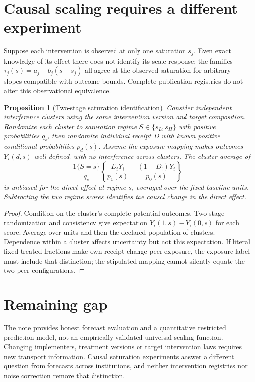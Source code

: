 \documentclass[11pt]{article}
\newtheorem{proposition}[theorem]{Proposition}
\theoremstyle{remark}
\begin{document}
\section*{Causal scaling requires a different experiment}
Suppose each intervention is observed at only one saturation $s_j$. Even exact knowledge of its effect there does not identify its scale response: the families
$\tau_j(s)=a_j+b_j(s-s_j)$ all agree at the observed saturation for arbitrary slopes compatible with outcome bounds. Complete publication registries do not alter this observational equivalence.

\begin{proposition}[Two-stage saturation identification]
Consider independent interference clusters using the same intervention version and target composition. Randomize each cluster to saturation regime $S\in\{s_L,s_H\}$ with positive probabilities $q_s$, then randomize individual receipt $D$ with known positive conditional probabilities $p_d(s)$. Assume the exposure mapping makes outcomes $Y_i(d,s)$ well defined, with no interference across clusters. The cluster average of
\[
 \frac{1\{S=s\}}{q_s}
 \left\{\frac{D_iY_i}{p_1(s)}-\frac{(1-D_i)Y_i}{p_0(s)}\right\}
\]
is unbiased for the direct effect at regime $s$, averaged over the fixed baseline units. Subtracting the two regime scores identifies the causal change in the direct effect.
\end{proposition}
\begin{proof}
Condition on the cluster's complete potential outcomes. Two-stage randomization and consistency give expectation $Y_i(1,s)-Y_i(0,s)$ for each score. Average over units and then the declared population of clusters. Dependence within a cluster affects uncertainty but not this expectation. If literal fixed treated fractions make own receipt change peer exposure, the exposure label must include that distinction; the stipulated mapping cannot silently equate the two peer configurations.
\end{proof}

\section*{Remaining gap}
The note provides honest forecast evaluation and a quantitative restricted prediction model, not an empirically validated universal scaling function. Changing implementers, treatment versions or target intervention laws requires new transport information. Causal saturation experiments answer a different question from forecasts across institutions, and neither intervention registries nor noise correction remove that distinction.
\end{document}
